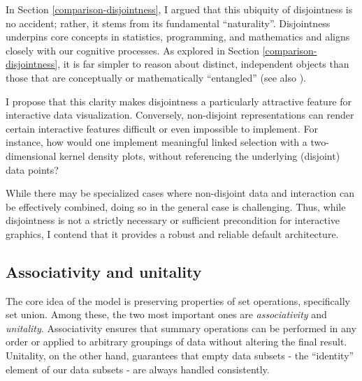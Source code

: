 \documentclass[
  openany]{book}
\theoremstyle{definition}
\theoremstyle{definition}
\theoremstyle{definition}
\theoremstyle{definition}
\theoremstyle{remark}
\begin{document}
In Section \ref{comparison-disjointness}, I argued that this ubiquity of disjointness is no accident; rather, it stems from its fundamental ``naturality''. Disjointness underpins core concepts in statistics, programming, and mathematics and aligns closely with our cognitive processes. As explored in Section \ref{comparison-disjointness}, it is far simpler to reason about distinct, independent objects than those that are conceptually or mathematically ``entangled'' (see also ).

I propose that this clarity makes disjointness a particularly attractive feature for interactive data visualization. Conversely, non-disjoint representations can render certain interactive features difficult or even impossible to implement. For instance, how would one implement meaningful linked selection with a two-dimensional kernel density plots, without referencing the underlying (disjoint) data points?

While there may be specialized cases where non-disjoint data and interaction can be effectively combined, doing so in the general case is challenging. Thus, while disjointness is not a strictly necessary or sufficient precondition for interactive graphics, I contend that it provides a robust and reliable default architecture.

\subsection{Associativity and unitality}\label{associativity-unitality}

The core idea of the model is preserving properties of set operations, specifically set union. Among these, the two most important ones are \emph{associativity} and \emph{unitality}. Associativity ensures that summary operations can be performed in any order or applied to arbitrary groupings of data without altering the final result. Unitality, on the other hand, guarantees that empty data subsets - the ``identity'' element of our data subsets - are always handled consistently.
\end{document}
